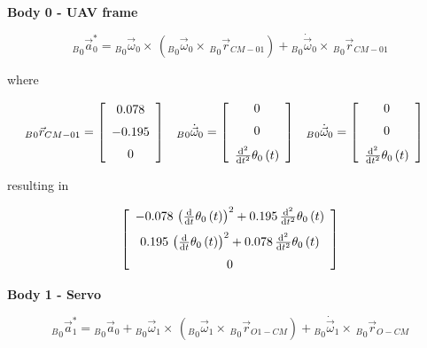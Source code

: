 \textbf{Body 0 - UAV frame}

\begin{equation}\label{aabody0}
{_B}_{0}\vec{a}_{0}^* = {_B}_{0}\vec{\omega}_{0}\times \,({_B}_{0}\vec{\omega}_{0}\times \,{_B}_{0}\vec{r}_{CM-01}) + {_B}_{0}\dot{\vec{\omega}}_{0}\times \,{_B}_{0}\vec{r}_{CM-01}
\end{equation}

where 

 \begin{align*}
_B{_0}\vec{r}_{CM-01} &=  \left[ \begin {array}{c}  0.078\\ \noalign{\medskip}- 0.195
\\ \noalign{\medskip}0\end {array} \right] 
&
_B{_0}\dot{\vec{\omega}}_{0} &= \left[ \begin {array}{c} 0\\ \noalign{\medskip}0\\ \noalign{\medskip}
{\frac {{\rm d}^{2}}{{\rm d}{t}^{2}}}\theta_{{0}} \left( t \right) 
\end {array} \right] 
 &
 _B{_0}\dot{\vec{\omega}}_{0} &=   \left[ \begin {array}{c} 0\\ \noalign{\medskip}0\\ \noalign{\medskip}
{\frac {{\rm d}^{2}}{{\rm d}{t}^{2}}}\theta_{{0}} \left( t \right) 
\end {array} \right] 
\end{align*}

resulting in 

\begin{equation}\label{newaabody0}
\left[ \begin {array}{c} - 0.078\, \left( {\frac {\rm d}{{\rm d}t}}
\theta_{{0}} \left( t \right)  \right) ^{2}+ 0.195\,{\frac {{\rm d}^{2
}}{{\rm d}{t}^{2}}}\theta_{{0}} \left( t \right) \\ \noalign{\medskip}
 0.195\, \left( {\frac {\rm d}{{\rm d}t}}\theta_{{0}} \left( t
 \right)  \right) ^{2}+ 0.078\,{\frac {{\rm d}^{2}}{{\rm d}{t}^{2}}}
\theta_{{0}} \left( t \right) \\ \noalign{\medskip}0\end {array}
 \right] 
\end{equation}

\textbf{Body 1 - Servo}

\begin{equation}\label{aabody01}
{_B}_{0}\vec{a}_{1}^* = {_B}_{0}\vec{a}_{0}+ {_B}_{0}\vec{\omega}_{1}\times \,({_B}_{0}\vec{\omega}_{1}\times \,{_B}_{0}\vec{r}_{O1-CM}) + {_B}_{0}\dot{\vec{\omega}}_{1}\times \,{_B}_{0}\vec{r}_{O-CM}
\end{equation}

